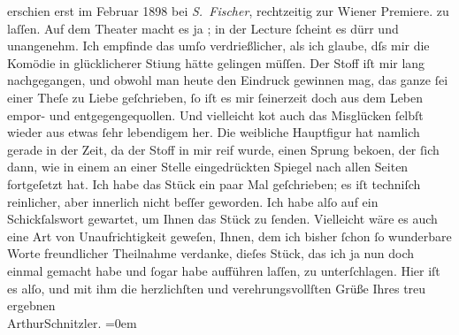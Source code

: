 \begin{ledgroupsized}[t]{13cm}
{{{                  erschien erst im Februar 1898 bei \emph{S. Fischer}, rechtzeitig zur Wiener Premiere.}}}\label{K_L00636-1h} zu laſſen. Auf dem Theater macht es ja
                  \label{K_L00636-2v}\label{K_L00636-2h}; in der Lecture ſcheint es dürr und
               unangenehm. Ich empfinde das umſo verdrießlicher, als ich glaube, dſs mir die Komödie
               in glücklicherer Sti{\geminationm}ung hätte gelingen müſſen. {\pb}Der Stoff iſt mir lang nachgegangen, und obwohl
               man heute den Eindruck gewinnen mag, das ganze ſei einer Theſe zu Liebe geſchrieben,
               ſo iſt es mir ſeinerzeit doch aus dem Leben empor- und entgegengequollen. Und
               vielleicht ko{\geminationm}t auch das Misglücken ſelbſt wieder aus
               etwas ſehr lebendigem {\pb}her. Die weibliche
               Hauptfigur hat namlich gerade in der Zeit, da der Stoff in mir reif wurde, einen
               Sprung beko{\geminationm}en, der ſich dann, wie in einem an einer
               Stelle eingedrückten Spiegel nach allen Seiten fortgeſetzt hat. Ich habe das Stück ein paar Mal geſchrieben;
               es iſt techniſch reinlicher, aber innerlich {\pb}nicht
               beſſer geworden. Ich habe alſo auf ein Schickſalswort gewartet, um Ihnen das Stück zu
               ſenden. Vielleicht wäre es auch eine Art von Unaufrichtigkeit geweſen, Ihnen, dem ich
               bisher ſchon ſo wunderbare Worte freundlicher Theilnahme verdanke, dieſes Stück, das
               ich ja nun doch einmal {\pb}gemacht habe und ſogar
               habe aufführen laſſen, zu unterſchlagen.\pend
           \pstart
           Hier iſt es alſo, und mit
               ihm die herzlichſten und verehrungsvollſten Grüße Ihres treu ergebnen{\\[\baselineskip]}\spacefill\mbox{ArthurSchnitzler.}\pend
           \leftskip=0em{}
         
         \endnumbering{}\end{ledgroupsized}  \newcommand{\dateiname}{L00636}\newcommand{\titel}{Arthur Schnitzler an Georg Brandes, 11. 1. 1897}\newcommand{\editorInnen}{Martin Anton Müller und Gerd-Hermann Susen}
      